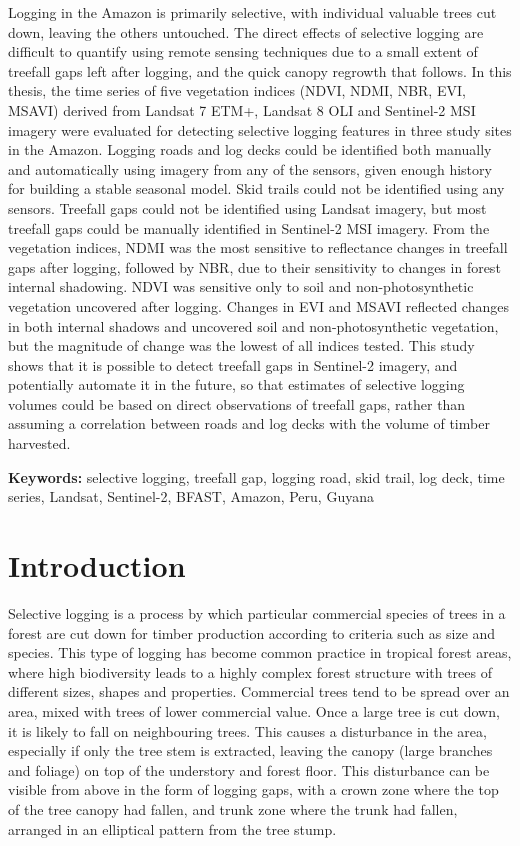 \documentclass[a4paper,12pt]{scrbook}
\begin{document}
Logging in the Amazon is primarily selective, with individual valuable trees cut down, leaving the others untouched. The direct effects of selective logging are difficult to quantify using remote sensing techniques due to a small extent of treefall gaps left after logging, and the quick canopy regrowth that follows. In this thesis, the time series of five vegetation indices (NDVI, NDMI, NBR, EVI, MSAVI) derived from Landsat 7 ETM+, Landsat 8 OLI and Sentinel-2 MSI imagery were evaluated for detecting selective logging features in three study sites in the Amazon. Logging roads and log decks could be identified both manually and automatically using imagery from any of the sensors, given enough history for building a stable seasonal model. Skid trails could not be identified using any sensors. Treefall gaps could not be identified using Landsat imagery, but most treefall gaps could be manually identified in Sentinel-2 MSI imagery. From the vegetation indices, NDMI was the most sensitive to reflectance changes in treefall gaps after logging, followed by NBR, due to their sensitivity to changes in forest internal shadowing. NDVI was sensitive only to soil and non-photosynthetic vegetation uncovered after logging. Changes in EVI and MSAVI reflected changes in both internal shadows and uncovered soil and non-photosynthetic vegetation, but the magnitude of change was the lowest of all indices tested. This study shows that it is possible to detect treefall gaps in Sentinel-2 imagery, and potentially automate it in the future, so that estimates of selective logging volumes could be based on direct observations of treefall gaps, rather than assuming a correlation between roads and log decks with the volume of timber harvested.

\textbf{Keywords:} selective logging, treefall gap, logging road, skid trail, log deck, time series, Landsat, Sentinel-2, BFAST, Amazon, Peru, Guyana

\tableofcontents

\chapter{Introduction}

Selective logging is a process by which particular commercial species of trees in a forest are cut down for timber production according to criteria such as size and species. This type of logging has become common practice in tropical forest areas, where high biodiversity leads to a highly complex forest structure with trees of different sizes, shapes and properties. Commercial trees tend to be spread over an area, mixed with trees of lower commercial value. Once a large tree is cut down, it is likely to fall on neighbouring trees. This causes a disturbance in the area, especially if only the tree stem is extracted, leaving the canopy (large branches and foliage) on top of the understory and forest floor. This disturbance can be visible from above in the form of logging gaps, with a crown zone where the top of the tree canopy had fallen, and trunk zone where the trunk had fallen, arranged in an elliptical pattern from the tree stump.
\end{document}
